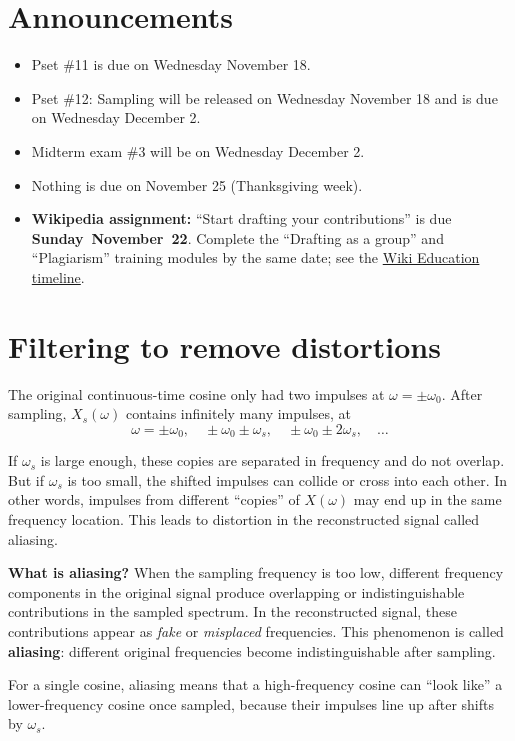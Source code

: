 \section{Announcements}
\begin{itemize}
    \item Pset \#11 is due on Wednesday November 18.
    \item Pset \#12: Sampling will be released on Wednesday November 18 and is due on Wednesday December 2.
    \item Midterm exam \#3 will be on Wednesday December 2.
    \item Nothing is due on November 25 (Thanksgiving week).
    \item \textbf{Wikipedia assignment:} ``Start drafting your contributions'' is due
    \textbf{\mbox{Sunday November 22}}. Complete the ``Drafting as a group'' and
    ``Plagiarism'' training modules by the same date; see the
    \href{https://dashboard.wikiedu.org/courses/UC_Merced/Signal_Processing_and_Linear_Systems_(Fall_2026)/timeline}{Wiki Education timeline}.
\end{itemize}

\section{Filtering to remove distortions}

The original continuous-time cosine only had two impulses 
at $\omega = \pm\omega_0$. After sampling, $X_s(\omega)$ contains infinitely
many impulses, at
\[
\omega = \pm\omega_0, \quad
\pm\omega_0 \pm \omega_s, \quad
\pm\omega_0 \pm 2\omega_s, \quad \dots
\]

If $\omega_s$ is large enough, these copies are separated in frequency and do not overlap.
But if $\omega_s$ is too small, the shifted impulses can collide or cross into each other.
In other words, impulses from different ``copies'' of $X(\omega)$ may end up in the same
frequency location. This leads to distortion in the reconstructed signal called aliasing.

\textbf{What is aliasing?} When the sampling frequency is too low,
different frequency components in the original signal produce overlapping or indistinguishable
contributions in the sampled spectrum. In the reconstructed signal, these contributions
appear as \emph{fake} or \emph{misplaced} frequencies. This phenomenon is called \textbf{aliasing}:
different original frequencies become indistinguishable after sampling.

For a single cosine, aliasing means that a high-frequency cosine can ``look like'' a lower-frequency cosine once sampled, because their impulses line up after shifts
by $\omega_s$.


